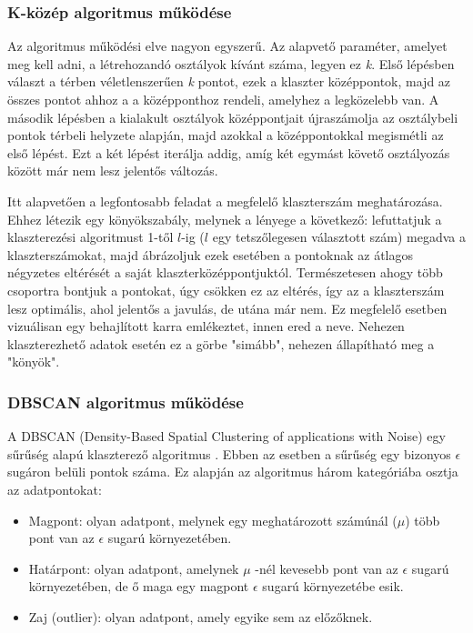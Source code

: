 \documentclass[12pt]{article}
\begin{document}
\subsubsection{K-közép algoritmus működése}
Az algoritmus működési elve nagyon egyszerű. Az alapvető paraméter, amelyet meg kell adni, a létrehozandó osztályok kívánt száma, legyen ez \textit{k}. Első lépésben választ a térben véletlenszerűen \textit{k} pontot, ezek a klaszter középpontok, majd az összes pontot ahhoz a a középponthoz rendeli, amelyhez a legközelebb van. A második lépésben a kialakult osztályok középpontjait újraszámolja az osztálybeli pontok térbeli helyzete alapján, majd azokkal a középpontokkal megismétli az első lépést. Ezt a két lépést iterálja addig, amíg két egymást követő osztályozás között már nem lesz jelentős változás.

Itt alapvetően a legfontosabb feladat a megfelelő klaszterszám meghatározása. Ehhez létezik egy könyökszabály, melynek a lényege a következő: lefuttatjuk a klaszterezési algoritmust 1-től $l$-ig ($l$ egy tetszőlegesen választott szám) megadva a klaszterszámokat, majd ábrázoljuk ezek esetében a pontoknak az átlagos négyzetes eltérését a saját klaszterközéppontjuktól. Természetesen ahogy több csoportra bontjuk a pontokat, úgy csökken ez az eltérés, így az a klaszterszám lesz optimális, ahol jelentős a javulás, de utána már nem. Ez megfelelő esetben vizuálisan egy behajlított karra emlékeztet, innen ered a neve. Nehezen klaszterezhető adatok esetén ez a görbe "simább", nehezen állapítható meg a "könyök".

\subsubsection{DBSCAN algoritmus működése}

A DBSCAN (Density-Based Spatial Clustering of applications with Noise) egy sűrűség alapú klaszterező algoritmus \cite{dbscan}. Ebben az esetben a sűrűség egy bizonyos $\epsilon$ sugáron belüli pontok száma. Ez alapján az algoritmus három kategóriába osztja az adatpontokat:
\begin{itemize}
\item Magpont: olyan adatpont, melynek egy meghatározott számúnál ($\mu$) több pont van az $\epsilon$ sugarú környezetében.
\item Határpont: olyan adatpont, amelynek $\mu$ -nél kevesebb pont van az $\epsilon$ sugarú környezetében, de ő maga egy magpont $\epsilon$ sugarú környezetébe esik.
\item Zaj (outlier): olyan adatpont, amely egyike sem az előzőknek.
\end{itemize}
\end{document}
